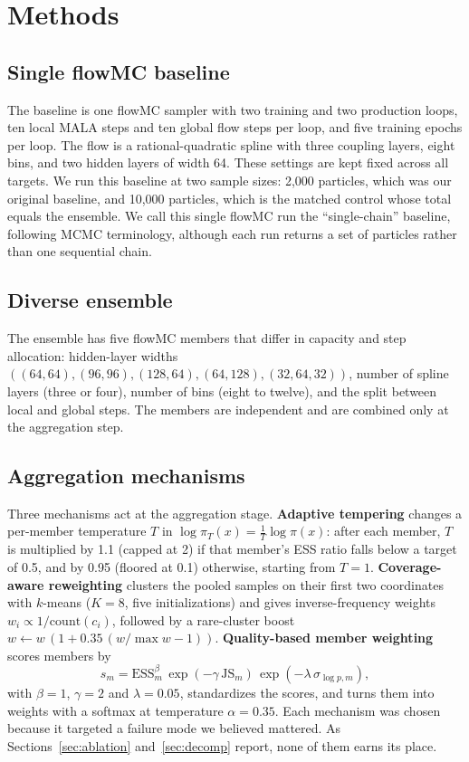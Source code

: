 \documentclass[11pt]{article}
\begin{document}
\section{Methods}

\subsection{Single flowMC baseline}
The baseline is one flowMC sampler with two training and two production loops,
ten local MALA steps and ten global flow steps per loop, and five training
epochs per loop. The flow is a rational-quadratic spline with three coupling
layers, eight bins, and two hidden layers of width 64. These settings are kept
fixed across all targets. We run this baseline at two sample sizes: 2{,}000
particles, which was our original baseline, and 10{,}000 particles, which is
the matched control whose total equals the ensemble. We call this single
flowMC run the ``single-chain'' baseline, following MCMC terminology, although
each run returns a set of particles rather than one sequential chain.

\subsection{Diverse ensemble}
The ensemble has five flowMC members that differ in capacity and step
allocation: hidden-layer widths
$((64,64),(96,96),(128,64),(64,128),(32,64,32))$, number of spline layers
(three or four), number of bins (eight to twelve), and the split between local
and global steps. The members are independent and are combined only at the
aggregation step.

\subsection{Aggregation mechanisms}
\label{sec:mechanisms}
Three mechanisms act at the aggregation stage. \textbf{Adaptive tempering}
changes a per-member temperature $T$ in
$\log\pi_T(x)=\tfrac{1}{T}\log\pi(x)$: after each member, $T$ is multiplied by
1.1 (capped at 2) if that member's ESS ratio falls below a target of 0.5, and
by 0.95 (floored at 0.1) otherwise, starting from $T=1$.
\textbf{Coverage-aware reweighting} clusters the pooled samples on their first
two coordinates with $k$-means ($K=8$, five initializations) and gives
inverse-frequency weights $w_i\propto 1/\mathrm{count}(c_i)$, followed by a
rare-cluster boost $w \leftarrow w\,(1+0.35\,(w/\max w - 1))$.
\textbf{Quality-based member weighting} scores members by
\begin{equation}
s_m=\mathrm{ESS}_m^{\beta}\,\exp(-\gamma\,\mathrm{JS}_m)\,
\exp(-\lambda\,\sigma_{\log p,m}),
\label{eq:score}
\end{equation}
with $\beta=1$, $\gamma=2$ and $\lambda=0.05$, standardizes the scores, and
turns them into weights with a softmax at temperature $\alpha=0.35$. Each
mechanism was chosen because it targeted a failure mode we believed mattered.
As Sections~\ref{sec:ablation} and~\ref{sec:decomp} report, none of them earns
its place.
\end{document}
